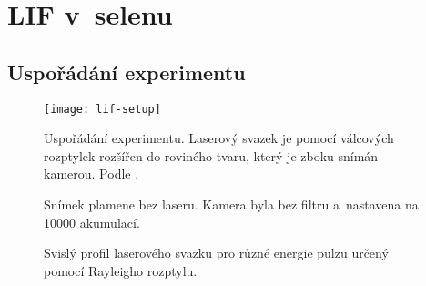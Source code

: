 \chapter[LIF]{LIF v~selenu}

\providecommand\xpos{x}
\providecommand\ypos{y}
\providecommand\laser{L}
\providecommand\lif{F}

\section{Uspořádání experimentu}

\begin{figure}
	\texttt{[image: lif-setup]}
	\caption{Uspořádání experimentu.
		Laserový svazek je pomocí válcových rozptylek rozšířen
		do roviného tvaru, který je zboku snímán kamerou.
		Podle \cite{lif-oh}.}
\end{figure}

\begin{figure}
	
	\caption{Snímek plamene bez laseru.
		Kamera byla bez filtru a~nastavena na \num{10000} akumulací.}
\end{figure}

\begin{figure}
	
	\caption{Svislý profil laserového svazku pro různé energie pulzu
		určený pomocí Rayleigho rozptylu.}
\end{figure}
